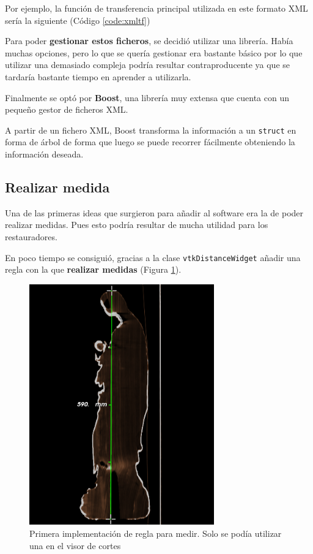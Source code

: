 Por ejemplo, la función de transferencia principal utilizada en este formato XML sería la siguiente (Código \ref{code:xmltf})



Para poder\textbf{ gestionar estos ficheros}, se decidió utilizar una librería. Había muchas opciones, pero lo que se quería gestionar era bastante básico por lo que utilizar una demasiado compleja podría resultar contraproducente ya que se tardaría bastante tiempo en aprender a utilizarla.

Finalmente se optó por \textbf{Boost}, una librería muy extensa que cuenta con un pequeño gestor de ficheros XML. 

A partir de un fichero XML, Boost transforma la información a un \texttt{struct} en forma de árbol de forma que luego se puede recorrer fácilmente obteniendo la información deseada.

\subsection{Realizar medida}

Una de las primeras ideas que surgieron para añadir al software era la de poder realizar medidas. Pues esto podría resultar de mucha utilidad para los restauradores.

En poco tiempo se consiguió, gracias a la clase \texttt{vtkDistanceWidget} añadir una regla con la que \textbf{realizar medidas} (Figura \ref{fig:primera_regla}).

\begin{figure}[H]
	\centering
	\includegraphics[width=8cm]{imagenes/primera_regla}
	\caption{Primera implementación de regla para medir. Solo se podía utilizar una en el visor de cortes}
	\label{fig:primera_regla}
\end{figure}

